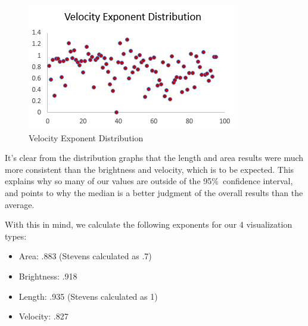 \documentclass{article}
\begin{document}
\begin{multicols}{2}
\begin{figure}[H]
    \centering
    \includegraphics[width=\columnwidth]{VelocityGraph}
    \caption{Velocity Exponent Distribution}
    \label{fig:VelocityGraph}
\end{figure}

It's clear from the distribution graphs that the length and area results were much more consistent than the brightness and velocity, which is to be expected. This explains why so many of our values are outside of the 95\%\ confidence interval, and points to why the median is a better judgment of the overall results than the average. \cite{ericEJ982771} \par 

With this in mind, we calculate the following exponents for our 4 visualization types:
\begin{itemize}
    \item Area: .883 (Stevens calculated as .7)
    \item Brightness: .918
    \item Length: .935 (Stevens calculated as 1)
    \item Velocity: .827
\end{itemize}


\end{multicols}
\end{document}
